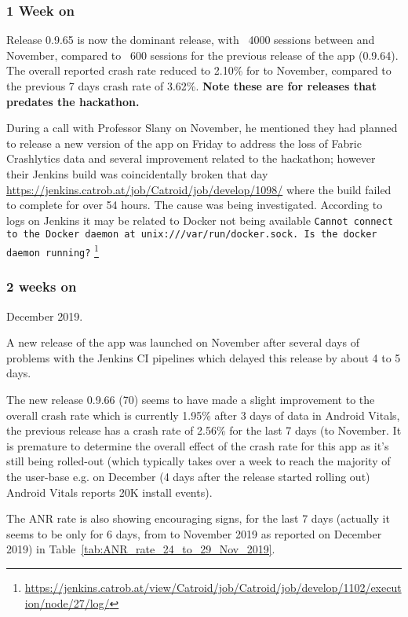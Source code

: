 \subsubsection{1 Week on}
Release 0.9.65 is now the dominant release, with ~4000 sessions between  and  November, compared to ~600 sessions for the previous release of the app (0.9.64). The overall reported crash rate reduced to 2.10\% for  to  November, compared to the previous 7 days crash rate of 3.62\%. \textbf{Note these are for releases that predates the hackathon.}

During a call with Professor Slany on  November, he mentioned they had planned to release a new version of the app on Friday to address the loss of Fabric Crashlytics data and several improvement related to the hackathon; however their Jenkins build was coincidentally broken that day \url{https://jenkins.catrob.at/job/Catroid/job/develop/1098/} where the build failed to complete for over 54 hours. The cause was being investigated. According to logs on Jenkins it may be related to Docker not being available \texttt{Cannot connect to the Docker daemon at unix:///var/run/docker.sock. Is the docker daemon running?} \footnote{\url{https://jenkins.catrob.at/view/Catroid/job/Catroid/job/develop/1102/execution/node/27/log/}}

\subsubsection{2 weeks on}
 December 2019.

A new release of the app was launched on November  after several days of problems with the Jenkins CI pipelines which delayed this release by about 4 to 5 days.

The new release 0.9.66 (70) seems to have made a slight improvement to the overall crash rate which is currently 1.95\% after 3 days of data in Android Vitals, the previous release has a crash rate of 2.56\% for the last 7 days (to  November. It is premature to determine the overall effect of the crash rate for this app as it's still being rolled-out (which typically takes over a week to reach the majority of the user-base e.g. on  December (4 days after the release started rolling out) Android Vitals reports 20K install events).

The ANR rate is also showing encouraging signs, for the last 7 days (actually it seems to be only for 6 days, from  to  November 2019 as reported on  December 2019) in Table~\ref{tab:ANR_rate_24_to_29_Nov_2019}.

